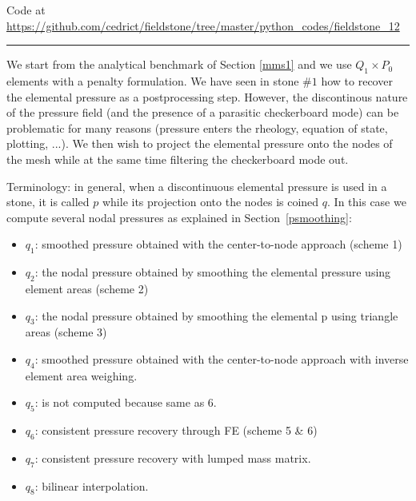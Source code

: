 

\begin{center}
Code at \url{https://github.com/cedrict/fieldstone/tree/master/python_codes/fieldstone_12}
\end{center}

\par\noindent\rule{\textwidth}{0.4pt}


We start from the analytical benchmark of Section \ref{mms1} and we use $Q_1 \times P_0$
elements with a penalty formulation. 
We have seen in stone $\# 1$ how to recover the elemental pressure as a postprocessing step. 
However, the discontinous nature of the pressure field (and the presence of a
parasitic checkerboard mode) can be problematic for many reasons 
(pressure enters the rheology, equation of state, plotting, ...). 
We then wish to project the elemental pressure onto the nodes of the mesh while at the same 
time filtering the checkerboard mode out. 

Terminology: in general, when a discontinuous elemental pressure is used in a stone, 
it is called $p$ while its projection onto the nodes is coined $q$. 
In this case we compute several nodal pressures as explained in Section~\ref{psmoothing}:

\begin{itemize}
\item $q_1$: smoothed pressure obtained with the  center-to-node approach (scheme 1)

\item $q_2$: the nodal pressure obtained by smoothing the elemental pressure using element areas (scheme 2)

\item $q_3$: the nodal pressure obtained by smoothing the elemental p using triangle areas (scheme 3)

\item $q_4$: smoothed pressure obtained with the center-to-node approach with inverse element area weighing.

\item $q_5$: is not computed because same as 6.

\item $q_6$: consistent pressure recovery through FE (scheme 5 \& 6)

\item $q_7$: consistent pressure recovery with lumped mass matrix. 

\item $q_8$: bilinear interpolation. 

\end{itemize}

